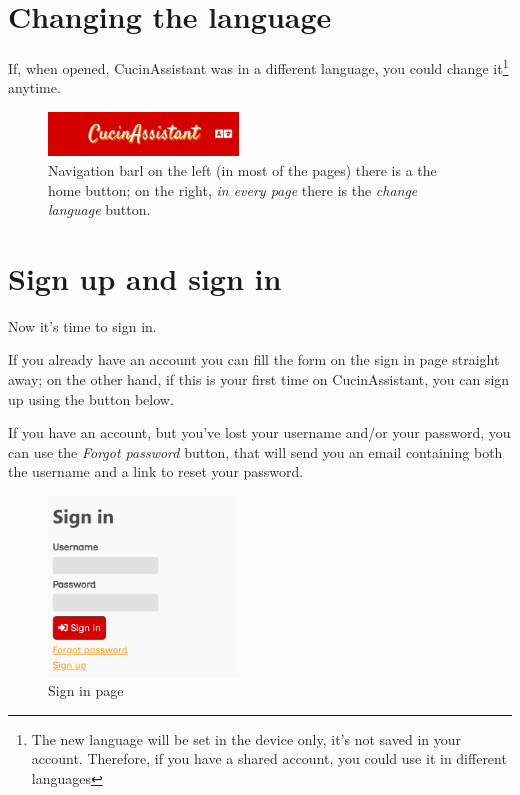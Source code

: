 \documentclass[12pt, a4paper]{report}
\begin{document}
    \section{Changing the language} \label{changelang}

    If, when opened, CucinAssistant was in a different language, you could change it\footnote{The new language will be set in the device only, it's
    not saved in your account. Therefore, if you have a shared account, you could use it in different languages} anytime.

    \begin{figure}[H]
        \centering
        \includegraphics[width=0.45\textwidth]{assets/nav.png}
        \caption{Navigation barl on the left (in most of the pages) there is a the home button; on the right, \emph{in every page} there is the
        \emph{change language} button.}
    \end{figure}

    \section{Sign up and sign in}

    Now it's time to sign in.

    If you already have an account you can fill the form on the sign in page straight away; on the other hand, if this is your first time on
    CucinAssistant, you can sign up using the button below.

    If you have an account, but you've lost your username and/or your password, you can use the \emph{Forgot password} button, that will send you an
    email containing both the username and a link to reset your password.

    \begin{figure}[H]
        \centering
        \includegraphics[width=0.45\textwidth]{assets/en/signin.png}
        \caption{Sign in page}
    \end{figure}
\end{document}
